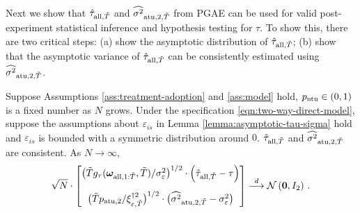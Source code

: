 Next we show that $\hat{\tau}_{\mathrm{all},\tilde{T}}$ and $\widehat{\sigma^2}_{\mathrm{atu},2,\tilde{T}}$ from PGAE can be used for valid post-experiment statistical inference and hypothesis testing for $\tau$. To show this, there are two critical steps: (a) show the asymptotic distribution of $\hat{\tau}_{\mathrm{all},\tilde{T}}$; (b) show that the asymptotic variance of $\hat{\tau}_{\mathrm{all},\tilde{T}}$ can be consistently estimated using $\widehat{\sigma^2}_{\mathrm{atu},2,\tilde{T}}$.

\begin{theorem}\label{theorem:asymptotic-page}
Suppose Assumptions \ref{ass:treatment-adoption} and \ref{ass:model} hold, $p_{\mathrm{ntu}} \in (0,1)$ is a fixed number as $N$ grows. Under the specification \eqref{eqn:two-way-direct-model}, suppose the assumptions about $\varepsilon_{is}$ in Lemma \ref{lemma:asymptotic-tau-sigma} hold and $\varepsilon_{is}$ is bounded with a symmetric distribution around $0$. $\hat{\tau}_{\mathrm{all},\tilde{T}}$ and $\widehat{\sigma^2}_{\mathrm{atu},2,\tilde{T}}$ are consistent.
As $N \rightarrow \infty$,
        \begin{align}
        \sqrt{N} \cdot \begin{bmatrix}
    \big(\tilde{T}\funfrac(\bm{\omega}_{\all,1:\tilde{T}},\tilde{T})/\sigma_\varepsilon^2\big)^{1/2} \cdot \left( \hat{\tau}_{\all,\tilde{T}} - \tau\right) \vspace{0.3cm}  \\ \big(\tilde{T} p_{\ad,2}/\xi^{\dagger 2}_{\varepsilon,\tilde{T}} \big)^{1/2} \cdot \big(\estsigmasq_{\ad,2,\tilde{T}} - \sigma_\varepsilon^2 \big)
        \end{bmatrix}
        \stackrel{d}{\longrightarrow } \mathcal{N} \left(\bm{0}, I_2 \right) \label{eqn:cond-normal}\, .
    \end{align}
    \end{theorem}
